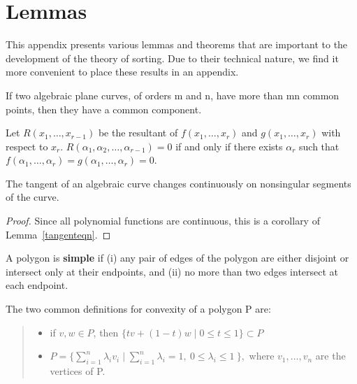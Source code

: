 \chapter{Lemmas}

This appendix presents various lemmas and theorems that are
important to the development of the theory of sorting.
Due to their technical nature, we find it more convenient
to place these results in an appendix.
%
\begin{theorem}
\label{bezout}
If two algebraic plane curves, of orders m and n, have more than mn common
points, then they have a common component.
\end{theorem}
%
\begin{lemma}[{\cite[pp. 25, 26, 59]{wa}}]
\label{resultant}
Let $R(x_{1},\ldots,x_{r-1})$ be the resultant of $f(x_{1},\ldots,x_{r})$
and $g(x_{1},\ldots,x_{r})$ with respect to $x_{r}$.
\mbox{$R(\alpha_{1},\alpha_{2},\ldots,\alpha_{r-1}) = 0$} if and only if
there exists $\alpha_{r}$ such that
\mbox{$f(\alpha_{1},\ldots,\alpha_{r})
= g(\alpha_{1},\ldots,\alpha_{r}) = 0 $}.
\end{lemma}
%
\begin{lemma}
\label{tangcont}
The tangent of an algebraic curve changes continuously on nonsingular
segments of the curve.
\end{lemma}
\begin{proof}
Since all polynomial functions are continuous, this is a corollary of 
Lemma~\ref{tangenteqn}.
\end{proof}
%
\begin{definition}
A polygon is {\bf simple} if (i) any pair of edges of the polygon are either
disjoint or intersect only at their endpoints, and (ii) no more than two edges
intersect at each endpoint.
\end{definition}

The two common definitions for convexity of a polygon P are:
\begin{quote}
\begin{itemize}
  \item if $v,w \in P$, then $\{tv + (1-t)w \mid 0\leq t \leq 1\} \subset P$
  \item $P = \{ \sum_{i=1}^{n} \lambda _{i}v_{i} \mid 
     \sum_{i=1}^{n} \lambda _{i} = 1,\ 0 \leq \lambda _{i} \leq 1\ \},$ 
     where $v_{1}, \ldots ,v_{n}$ are the 
     vertices of P.
\end{itemize}
\end{quote}

